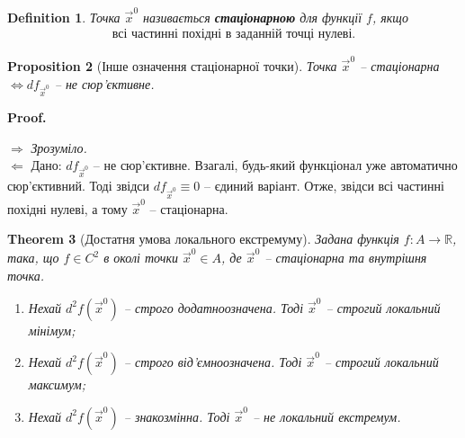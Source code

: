 \documentclass[a4paper, 10pt]{article}
\makeatletter
\def\rightproof{$\boxed{\Rightarrow}$ }
\def\leftproof{$\boxed{\Leftarrow}$ }
\theoremstyle{theoremdd}
\newtheorem{theorem}{Theorem}[subsection]
\theoremstyle{theoremdd}
\theoremstyle{theoremdd}
\newtheorem{definition}[theorem]{Definition}
\theoremstyle{theoremdd}
\theoremstyle{theoremdd}
\theoremstyle{theoremdd}
\newtheorem{proposition}[theorem]{Proposition}
\theoremstyle{theoremdd}
\theoremstyle{theoremdd}
\theoremstyle{theoremdd}
\renewenvironment{proof}[1][Proof.\\]{\par
\pushQED{\hfill \qed}%
\normalfont \topsep6\p@\@plus6\p@\relax
\trivlist
\item\relax
{\bfseries
#1\@addpunct{.}}\hspace\labelsep\ignorespaces
}{%
\popQED\endtrivlist\@endpefalse
}
\makeatother
\begin{document}
\begin{definition}
Точка $\vec{x}^0$ називається \textbf{стаціонарною} для функції $f$, якщо
\begin{align*}
\text{всі частинні похідні в заданній точці нулеві.}
\end{align*}
\end{definition}

\begin{proposition}[Інше означення стаціонарної точки]
Точка $\vec{x}^0$ -- стаціонарна $\iff df_{\vec{x}^0}$ -- не сюр'єктивне.
\end{proposition}

\begin{proof}
\rightproof \textit{Зрозуміло.}
\bigskip \\
\leftproof Дано: $ df_{\vec{x}^0}$ -- не сюр'єктивне. Взагалі, будь-який функціонал уже автоматично сюр'єктивний. Тоді звідси $ df_{\vec{x}^0} \equiv 0$ -- єдиний варіант. Отже, звідси всі частинні похідні нулеві, а тому $\vec{x}^0$ -- стаціонарна.
\end{proof}

\begin{theorem}[Достатня умова локального екстремуму]
Задана функція $f\colon A \to \mathbb{R}$, така, що $f \in C^2$ в околі точки $\vec{x}^0 \in A$, де $\vec{x}^0$ -- стаціонарна та внутрішня точка.
\begin{enumerate}[nosep,wide=0pt,label={\arabic*)}]
\item Нехай $d^2 f(\vec{x}^0)$ -- строго додатноозначена. Тоді $\vec{x}^0$ -- строгий локальний мінімум;
\item Нехай $d^2 f(\vec{x}^0)$ -- строго від'ємноозначена. Тоді $\vec{x}^0$ -- строгий локальний максимум;
\item Нехай $d^2 f(\vec{x}^0)$ -- знакозмінна. Тоді $\vec{x}^0$ -- не локальний екстремум.
\end{enumerate}
\end{theorem}
\end{document}
